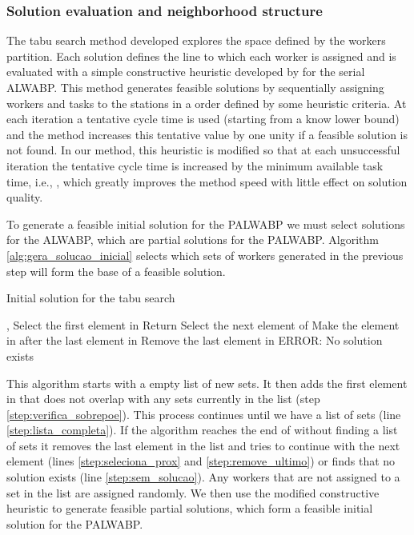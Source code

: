 \documentclass{singlecol-new}
\begin{document}
\subsubsection{Solution evaluation and neighborhood structure}

The tabu search method developed explores the space defined by the workers partition. Each solution defines the line  to which each worker is assigned  and is evaluated with a simple constructive heuristic developed by \cite{moreira12hybrid} for the serial ALWABP. This method generates feasible solutions by sequentially assigning workers and tasks to the stations in a order defined by some heuristic criteria. At each iteration a tentative cycle time is used (starting from a know lower bound) and the method increases this tentative value by one unity if a feasible solution is not found. In our method, this heuristic is modified so that at each unsuccessful iteration the tentative cycle time is increased by the minimum available task time, i.e., , which greatly improves the method speed with little effect on solution quality.

To generate a feasible initial solution for the PALWABP we must select  solutions for the ALWABP, which are partial solutions for the PALWABP. Algorithm \ref{alg:gera_solucao_inicial} selects which sets of workers generated in the previous step will form the base of a feasible solution.

\begin{algorithm}[!ht]
\caption{Initial solution for the tabu search}
\label{alg:gera_solucao_inicial}
\begin{algorithmic}[1]
\REQUIRE , 
\STATE 
\STATE Select  the first element in 
\WHILE{}
	\IF{ }\label{step:verifica_sobrepoe}
		\STATE 
	\ENDIF
	\IF{}
		\STATE Return \label{step:lista_completa}
	\ELSE
			\STATE Select  the next element of 
		\ELSE 
			\IF{}
				\STATE Make  the element in  after the last element in \label{step:seleciona_prox}
				\STATE Remove the last element in \label{step:remove_ultimo}
			\ELSE 
				\STATE ERROR: No solution exists\label{step:sem_solucao}
			\ENDIF
		\ENDIF
	\ENDIF
\ENDWHILE
\end{algorithmic}
\end{algorithm}

This algorithm starts with a empty list of new sets. It then adds the first element in  that does not overlap with any sets currently in the list (step \ref{step:verifica_sobrepoe}). This process continues until we have a list of  sets (line \ref{step:lista_completa}). If the algorithm reaches the end of  without finding a list of  sets it removes the last element in the list and tries to continue with the next element (lines \ref{step:seleciona_prox} and \ref{step:remove_ultimo}) or finds that no solution exists (line \ref{step:sem_solucao}). Any workers that are not assigned to a set in the list are assigned randomly. We then use the modified constructive heuristic to generate feasible partial solutions, which form a feasible initial solution for the PALWABP.
\end{document}
